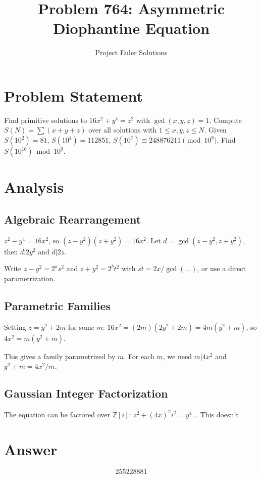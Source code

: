 \documentclass[11pt]{article}
\title{Problem 764: Asymmetric Diophantine Equation}
\author{Project Euler Solutions}
\date{}
\begin{document}
\maketitle
\section{Problem Statement}
Find primitive solutions to $16x^2 + y^4 = z^2$ with $\gcd(x,y,z) = 1$. Compute $S(N) = \sum(x+y+z)$ over all solutions with $1 \le x,y,z \le N$. Given $S(10^2) = 81$, $S(10^4) = 112851$, $S(10^7) \equiv 248876211 \pmod{10^9}$. Find $S(10^{16}) \bmod 10^9$.
\section{Analysis}
\subsection*{Algebraic Rearrangement}

$z^2 - y^4 = 16x^2$, so $(z-y^2)(z+y^2) = 16x^2$. Let $d = \gcd(z-y^2, z+y^2)$, then $d | 2y^2$ and $d | 2z$.

Write $z - y^2 = 2^a s^2$ and $z + y^2 = 2^b t^2$ with $st = 2x/\gcd(...)$, or use a direct parametrization.

\subsection*{Parametric Families}

Setting $z = y^2 + 2m$ for some $m$: $16x^2 = (2m)(2y^2 + 2m) = 4m(y^2+m)$, so $4x^2 = m(y^2+m)$.

This gives a family parametrized by $m$. For each $m$, we need $m | 4x^2$ and $y^2 + m = 4x^2/m$.

\subsection*{Gaussian Integer Factorization}

The equation can be factored over $\mathbb{Z}[i]$: $z^2 + (4x)^2 i^2 = y^4$... This doesn't
\section{Answer}

\[
\boxed{255228881}
\]
\end{document}
